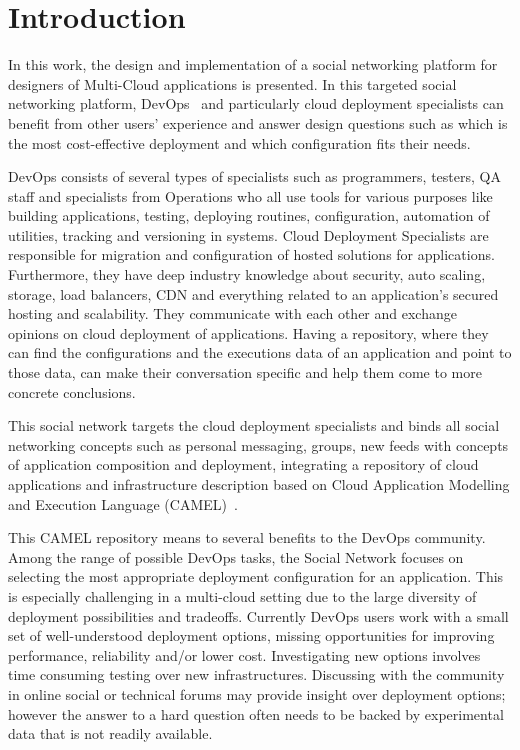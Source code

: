 \chapter{Introduction}
In this work, the design and implementation of a social networking platform for designers of Multi-Cloud applications is presented. In this targeted social networking platform, DevOps~\cite{loukides2012devops} and particularly cloud deployment specialists can benefit from other users' experience and answer design questions such as which is the most cost-effective deployment and which configuration fits their needs. 

DevOps consists of several types of specialists such as programmers, testers, QA staff and specialists from Operations who all use tools for various purposes like building applications, testing, deploying routines, configuration, automation of utilities, tracking and versioning in systems.  
Cloud Deployment Specialists are responsible for migration and configuration of hosted solutions for applications. Furthermore, they have deep industry knowledge about security, auto scaling, storage, load balancers, CDN and everything related to an application's secured hosting and scalability. They communicate with each other and exchange opinions on cloud deployment of applications. Having a repository, where they can find the configurations and the executions data of an application and point to those data, can make their conversation specific and help them come to more concrete conclusions.

This social network targets the cloud deployment specialists and binds all social networking concepts such as personal messaging, groups, new feeds with concepts of application composition and deployment, integrating a repository of cloud applications and infrastructure description based on Cloud Application Modelling and Execution Language (CAMEL)~\cite{paasagedeliverable212}. 

This CAMEL repository means to several benefits to the DevOps community.
Among the range of possible DevOps tasks, the Social Network focuses on selecting the most appropriate deployment
configuration for an application. This is especially challenging in a multi-cloud setting due to the
large diversity of deployment possibilities and tradeoffs. Currently DevOps users work with a small set of
well-understood deployment options, missing opportunities for improving performance, reliability and/or
lower cost. Investigating new options involves time consuming testing over new infrastructures. Discussing
with the community in online social or technical forums may provide insight over deployment options;
however the answer to a hard question often needs to be backed by experimental data that is not readily
available. 

